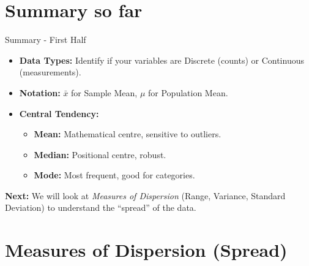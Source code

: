 \section{Summary so far}
\begin{frame}{Summary - First Half}
    \begin{itemize}
        \item \textbf{Data Types:} Identify if your variables are Discrete (counts) or Continuous (measurements).
        \item \textbf{Notation:} $\bar{x}$ for Sample Mean, $\mu$ for Population Mean.
        \item \textbf{Central Tendency:}
        \begin{itemize}
            \item \textbf{Mean:} Mathematical centre, sensitive to outliers.
            \item \textbf{Median:} Positional centre, robust.
            \item \textbf{Mode:} Most frequent, good for categories.
        \end{itemize}
    \end{itemize}

    \vspace{0.5cm}
    \textbf{Next:} We will look at \textit{Measures of Dispersion} (Range, Variance, Standard Deviation) to understand the ``spread'' of the data.
\end{frame}






\section{Measures of Dispersion (Spread)}

